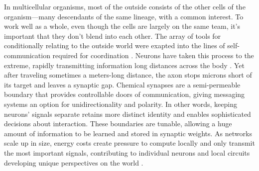 \documentclass[12pt]{article}
\begin{document}
In multicellular organisms, most of the outside consists of the other cells of the organism---many descendants of the same lineage, with a common interest. To work well as a whole, even though the cells are largely on the same team, it's important that they don't blend into each other. The array of tools for conditionally relating to the outside world were exapted into the lines of self-communication required for coordination \citep{west2015major,levin2023bioelectric}. Neurons have taken this process to the extreme, rapidly transmitting information long distances across the body \citep{shepherd2003synaptic}. Yet after traveling sometimes a meters-long distance, the axon stops microns short of its target and leaves a synaptic gap. Chemical synapses are a semi-permeable boundary that provides controllable doors of communication, giving messaging systems an option for unidirectionality and polarity. In other words, keeping neurons' signals separate retains more distinct identity and enables sophisticated decisions about interaction. These boundaries are tunable, allowing a huge amount of information to be learned and stored in synaptic weights. As networks scale up in size, energy costs create pressure to compute locally and only transmit the most important signals, contributing to individual neurons and local circuits developing unique perspectives on the world \citep{herculano2010connectivity, bullmore2009complex}.






\end{document}
